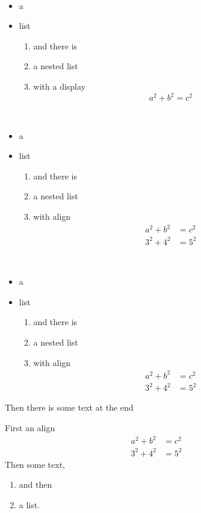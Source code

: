 \documentclass[leqno]{article}
\begin{document}
\begin{note}\ 
  \begin{itemize}
  \item a
  \item list
    \begin{enumerate}
    \item and there is
    \item a nested list
    \item with a display
      \[
        a^2 + b^2 = c^2
      \]
    \end{enumerate}
  \end{itemize}
\end{note}
\begin{note}\ 
  \begin{itemize}
  \item a
  \item list
    \begin{enumerate}
    \item and there is
    \item a nested list
    \item with align
      \begin{align}
        a^2 + b^2 & = c^2\\
        3^2 + 4^2 & = 5^2
      \end{align}
    \end{enumerate}
  \end{itemize}
\end{note}
\begin{note}\ 
  \begin{itemize}
  \item a
  \item list
    \begin{enumerate}
    \item and there is
    \item a nested list
    \item with align
      \begin{align}
        a^2 + b^2 & = c^2\\
        3^2 + 4^2 & = 5^2
      \end{align}
    \end{enumerate}
  \end{itemize}
  Then there is some text at the end
\end{note}
\begin{note} 
  First an align
  \begin{align}
    a^2 + b^2 & = c^2\\
    3^2 + 4^2 & = 5^2
  \end{align}
  Then some text, 
  \begin{enumerate}
  \item and then
  \item a list.
  \end{enumerate}
\end{note}
\end{document}
